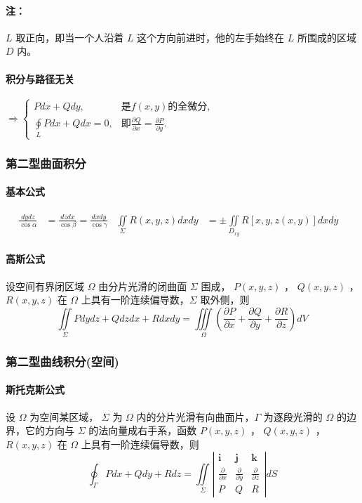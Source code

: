 ﻿\documentclass[a4paper,12pt,UTF8]{ctexart}
\begin{document}
    \paragraph{注：} \(L\) 取正向，即当一个人沿着 \(L\) 这个方向前进时，他的左手始终在 \(L\) 所围成的区域 \(D\) 内。
    
    \paragraph{积分与路径无关}
    \(\Rightarrow \begin{cases}
        Pdx+Qdy,& \text{是} f(x, y) \text{的全微分},\\
        \oint \limits_{L} Pdx+Qdx = 0,& \text{即} \frac{\partial Q}{\partial x} = \frac{\partial P}{\partial y}.
    \end{cases}\)

    \subsubsection{第二型曲面积分}
    \paragraph{基本公式}
    \begin{align*}
        \frac{dydz}{\cos \alpha}&=\frac{dzdx}{\cos \beta}=\frac{dxdy}{\cos \gamma}& \iint \limits_{\Sigma} R(x,y,z)dxdy&=\pm \iint \limits_{D_{xy}} R[x,y,z(x,y)]dxdy&
    \end{align*}

    \paragraph{高斯公式} 设空间有界闭区域 \(\Omega\) 由分片光滑的闭曲面 \(\Sigma \) 围成， \(P(x, y, z)\) ， \(Q(x, y, z)\) ， \(R(x, y, z)\) 在 \(\Omega\) 上具有一阶连续偏导数，\(\Sigma\) 取外侧，则
    \[\iint \limits_{\Sigma} Pdydz+Qdzdx+Rdxdy=\iiint \limits_{\Omega} \left( \frac{\partial P}{\partial x} + \frac{\partial Q}{\partial y} + \frac{\partial R}{\partial z} \right)dV^{}\]

    \subsubsection{第二型曲线积分(空间)}
    \paragraph{斯托克斯公式} 设 \(\Omega\) 为空间某区域， \(\Sigma \) 为 \(\Omega \) 内的分片光滑有向曲面片，\(\Gamma \) 为逐段光滑的 \(\Omega \) 的边界，它的方向与 \(\Sigma \) 的法向量成右手系，函数 \(P(x, y, z)\) ， \(Q(x, y, z)\) ， \(R(x, y, z)\) 在 \(\Omega\) 上具有一阶连续偏导数，则
    \[\oint_{\Gamma }Pdx+Qdy+Rdz = \iint \limits_{\Sigma }\left|\begin{array}{cccc}
        \mathbf{i}& \mathbf{j}& \mathbf{k}\\
        \frac{\partial}{\partial x}& \frac{\partial}{\partial y}& \frac{\partial}{\partial z}\\
        P& Q& R
    \end{array}\right|dS\]
\end{document}
